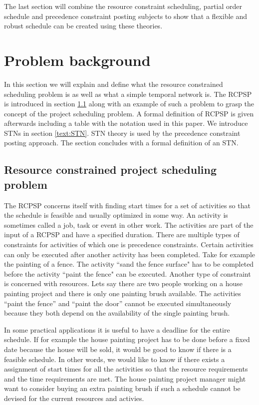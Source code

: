 \documentclass{article}
\begin{document}
The last section will combine the resource constraint scheduling, partial order schedule and precedence constraint posting subjects to show that a flexible and robust schedule can be created using these theories. 

\newpage

\section{Problem background}
In this section we will explain and define what the resource constrained scheduling problem is as well as what a simple temporal network is. 
The RCPSP is introduced in section \ref{text:RCPSP} along with an example of such a problem to grasp the concept of the project scheduling problem. 
A formal definition of RCPSP is given afterwards including a table with the notation used in this paper. 
We introduce STNs in section \ref{text:STN}. STN theory is used by the precedence constraint posting approach. The section concludes with a formal definition of an STN. 

\subsection{Resource constrained project scheduling problem}
\label{text:RCPSP}
The RCPSP concerns itself with finding start times for a set of activities so that the schedule is feasible and usually optimized in some way. 
An activity is sometimes called a job, task or event in other work. 
The activities are part of the input of a RCPSP and have a specified duration. 
There are multiple types of constraints for activities of which one is precedence constraints. 
Certain activities can only be executed after another activity has been completed. 
Take for example the painting of a fence. 
The activity ``sand the fence surface" has to be completed before the activity ``paint the fence" can be executed. 
Another type of constraint is concerned with resources. 
Lets say there are two people working on a house painting project and there is only one painting brush available. 
The activities ``paint the fence'' and ``paint the door'' cannot be executed simultaneously because they both depend on the availability of the single painting brush. 

In some practical applications it is useful to have a deadline for the entire schedule. 
If for example the house painting project has to be done before a fixed date because the house will be sold, it would be good to know if there is a feasible schedule. 
In other words, we would like to know if there exists a assignment of start times for all the activities so that the resource requirements and the time requirements are met. 
The house painting project manager might want to consider buying an extra painting brush if such a schedule cannot be devised for the current resources and activies. 
\end{document}
